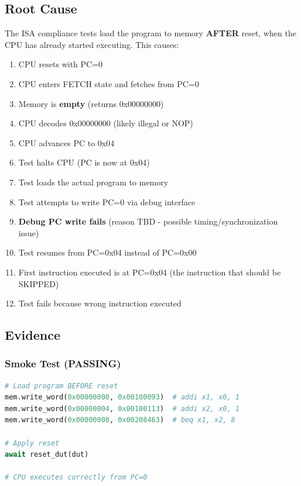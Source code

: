 \subsection{Root Cause}\label{cr:fix:rtl-isa-test-fix:root-cause}

\begin{record}

The ISA compliance tests load the program to memory \textbf{AFTER}
reset, when the CPU has already started executing. This causes:

\begin{enumerate}
\def\labelenumi{\arabic{enumi}.}
\tightlist
\item
  CPU resets with PC=0
\item
  CPU enters FETCH state and fetches from PC=0
\item
  Memory is \textbf{empty} (returns 0x00000000)
\item
  CPU decodes 0x00000000 (likely illegal or NOP)
\item
  CPU advances PC to 0x04
\item
  Test halts CPU (PC is now at 0x04)
\item
  Test loads the actual program to memory
\item
  Test attempts to write PC=0 via debug interface
\item
  \textbf{Debug PC write fails} (reason TBD - possible
  timing/\allowbreak{}synchronization issue)
\item
  Test resumes from PC=0x04 instead of PC=0x00
\item
  First instruction executed is at PC=0x04 (the instruction that should
  be SKIPPED)
\item
  Test fails because wrong instruction executed
\end{enumerate}

\end{record}

\subsection{Evidence}\label{cr:fix:rtl-isa-test-fix:evidence}

\subsubsection{Smoke Test (PASSING)}\label{cr:fix:rtl-isa-test-fix:smoke-test-passing}

\begin{record}

\begin{lstlisting}[language=Python]
# Load program BEFORE reset
mem.write_word(0x00000000, 0x00100093)  # addi x1, x0, 1
mem.write_word(0x00000004, 0x00100113)  # addi x2, x0, 1
mem.write_word(0x00000008, 0x00208463)  # beq x1, x2, 8

# Apply reset
await reset_dut(dut)

# CPU executes correctly from PC=0
\end{lstlisting}

\end{record}

